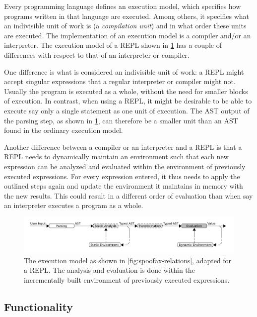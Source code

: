 Every programming language defines an execution model, which specifies how
programs written in that language are executed. Among others, it specifies what
an indivisible unit of work is (a \emph{compilation unit}) and in what order
these units are executed. The implementation of an execution model is a compiler
and/or an interpreter. The execution model of a REPL shown in
\cref{fig:execution-model-repl} has a couple of differences with respect to that
of an interpreter or compiler.

One difference is what is considered an indivisible unit of work: a REPL might
accept singular expressions that a regular interpreter or compiler might
not. Usually the program is executed as a whole, without the need for smaller
blocks of execution. In contrast, when using a REPL, it might be desirable to be
able to execute say only a single statement as one unit of execution. The AST
output of the parsing step, as shown in \cref{fig:execution-model-repl}, can
therefore be a smaller unit than an AST found in the ordinary execution model.

Another difference between a compiler or an interpreter and a REPL is that a
REPL needs to dynamically maintain an environment such that each new expression
can be analyzed and evaluated within the environment of previously executed
expressions. For every expression entered, it thus needs to apply the outlined
steps again and update the environment it maintains in memory with the new
results. This could result in a different order of evaluation than when say an
interpreter executes a program as a whole.

\begin{figure}[t]
  \centering
  \includegraphics[width=\textwidth]{execution-model-repl}
  \caption{The execution model as shown in \cref{fig:spoofax-relations}, adapted
    for a REPL. The analysis and evaluation is done within the incrementally
    built environment of previously executed expressions.}
  \label{fig:execution-model-repl}
\end{figure}

\subsection{Functionality}
\label{ssec:repl-functionality}


